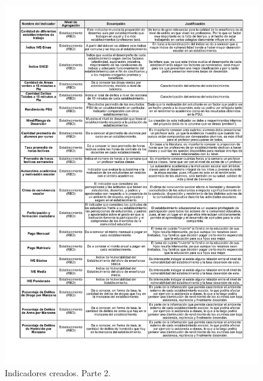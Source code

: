 \begin{figure}[H]
  \centering
    \includegraphics[width=1\textwidth]{Figuras/Indicadores2}
      \caption{Indicadores creados. Parte 2.}
    \label{fig:indicadores2}
\end{figure}
